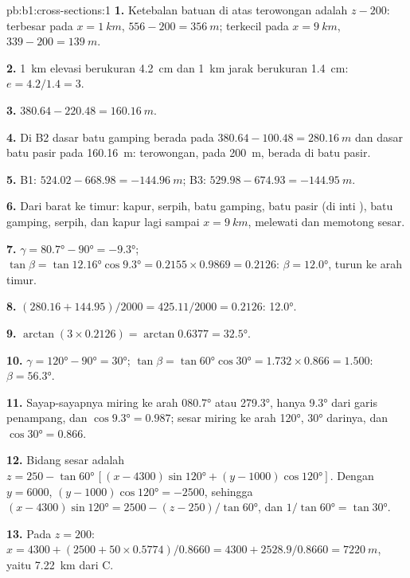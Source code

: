 \begin{solution}{pb:b1:cross-sections:1}
\textbf{1.} Ketebalan batuan di atas terowongan adalah $z - 200$: terbesar pada
$x = \qty{1}{km}$, $556 - 200 = \qty{356}{m}$; terkecil pada $x =
\qty{9}{km}$, $339 - 200 = \qty{139}{m}$.

\textbf{2.} \qty{1}{km} elevasi berukuran \qty{4.2}{cm} dan \qty{1}{km} jarak berukuran \qty{1.4}{cm}: $e = 4.2/1.4 = 3$.

\textbf{3.} $380.64 - 220.48 = \qty{160.16}{m}$.

\textbf{4.} Di B2 dasar batu gamping berada pada $380.64 - 100.48 =
\qty{280.16}{m}$ dan dasar batu pasir pada \qty{160.16}{m}: terowongan, pada \qty{200}{m}, berada di batu pasir.

\textbf{5.} B1: $524.02 - 668.98 = \qty{-144.96}{m}$; B3: $529.98 - 674.93 =
\qty{-144.95}{m}$.

\textbf{6.} Dari barat ke timur: kapur, serpih, batu gamping, batu pasir (di inti ), batu gamping, serpih, dan kapur lagi sampai $x = \qty{9}{km}$, melewati  dan memotong sesar.

\textbf{7.} $\gamma = \ang{80.7} - \ang{90} = \ang{-9.3}$; $\tan\beta =
\tan\ang{12.16}\cos\ang{9.3} = 0.2155\times0.9869 = 0.2126$: $\beta =
\ang{12.0}$, turun ke arah timur.

\textbf{8.} $(280.16 + 144.95)/2000 = 425.11/2000 = 0.2126$: \ang{12.0}.

\textbf{9.} $\arctan(3\times0.2126) = \arctan 0.6377 = \ang{32.5}$.

\textbf{10.} $\gamma = \ang{120} - \ang{90} = \ang{30}$; $\tan\beta =
\tan\ang{60}\cos\ang{30} = 1.732\times0.866 = 1.500$: $\beta = \ang{56.3}$.

\textbf{11.} Sayap-sayapnya miring ke arah \ang{080.7} atau \ang{279.3}, hanya \ang{9.3} dari garis penampang, dan $\cos\ang{9.3} = 0.987$; sesar miring ke arah \ang{120}, \ang{30} darinya, dan $\cos\ang{30} = 0.866$.

\textbf{12.} Bidang sesar adalah $z = 250 - \tan\ang{60}\,[(x - 4300)
\sin\ang{120} + (y - 1000)\cos\ang{120}]$. Dengan $y = 6000$, $(y - 1000)
\cos\ang{120} = -2500$, sehingga $(x - 4300)\sin\ang{120} = 2500 - (z - 250)/
\tan\ang{60}$, dan $1/\tan\ang{60} = \tan\ang{30}$.

\textbf{13.} Pada $z = 200$: $x = 4300 + (2500 + 50\times0.5774)/0.8660 =
4300 + 2528.9/0.8660 = \qty{7220}{m}$, yaitu \qty{7.22}{km} dari C.


\end{solution}
